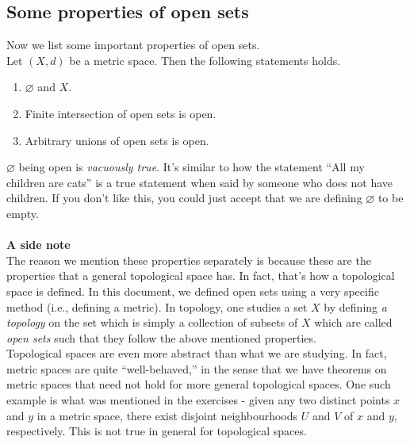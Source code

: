 \documentclass{article}
\let\emptyset\varnothing
\begin{document}
	\subsection{Some properties of open sets}
	Now we list some important properties of open sets.\\
	Let $(X, d)$ be a metric space. Then the following statements holds.
	\begin{enumerate} 
		\item $\emptyset$ and $X.$
		\item Finite intersection of open sets is open.
		\item Arbitrary unions of open sets is open.
	\end{enumerate}
	$\emptyset$ being open is \emph{vacuously true}. It's similar to how the statement ``All my children are cats'' is a true statement when said by someone who does not have children. If you don't like this, you could just accept that we are defining $\emptyset$ to be empty.\\~\\
	\textbf{A side note}\\
	The reason we mention these properties separately is because these are the properties that a general topological space has. In fact, that's how a topological space is defined. In this document, we defined open sets using a very specific method (i.e., defining a metric). In topology, one studies a set $X$ by defining \emph{a topology} on the set which is simply a collection of subsets of $X$ which are called \emph{open sets} such that they follow the above mentioned properties.\\
	Topological spaces are even more abstract than what we are studying. In fact, metric spaces are quite ``well-behaved,'' in the sense that we have theorems on metric spaces that need not hold for more general topological spaces. One such example is what was mentioned in the exercises - given any two distinct points $x$ and $y$ in a metric space, there exist disjoint neighbourhoods $U$ and $V$ of $x$ and $y,$ respectively. This is not true in general for topological spaces.
\end{document}
